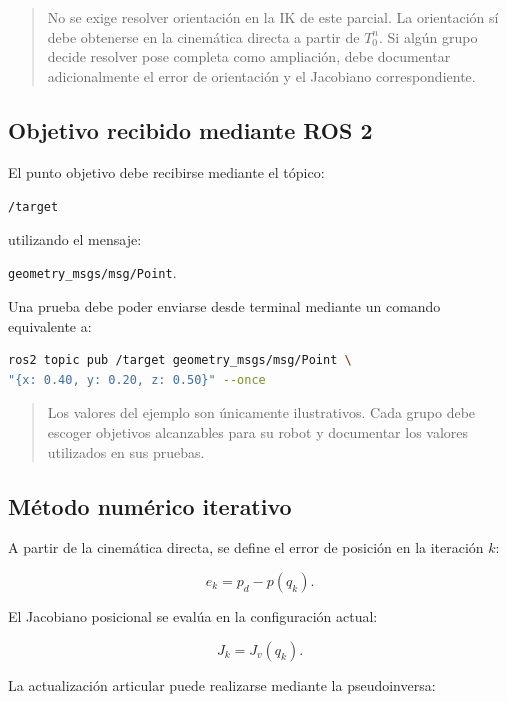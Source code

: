 \documentclass[journal]{IEEEtran}
\newcommand{\instr}[1]{%
\begin{quote}
\small
\noindent\textbf{\color{blue}{INSTRUCCIÓN:}} #1
\end{quote}
}
\begin{document}
\instr{No se exige resolver orientación en la IK de este parcial. La orientación sí debe obtenerse en la cinemática directa a partir de $T_0^n$. Si algún grupo decide resolver pose completa como ampliación, debe documentar adicionalmente el error de orientación y el Jacobiano correspondiente.}

\subsection{Objetivo recibido mediante ROS 2}

El punto objetivo debe recibirse mediante el tópico:

\begin{center}
\texttt{/target}
\end{center}

utilizando el mensaje:

\begin{center}
\texttt{geometry\_msgs/msg/Point}.
\end{center}

Una prueba debe poder enviarse desde terminal mediante un comando equivalente a:

\begin{lstlisting}[language=bash]
ros2 topic pub /target geometry_msgs/msg/Point \
"{x: 0.40, y: 0.20, z: 0.50}" --once
\end{lstlisting}

\instr{Los valores del ejemplo son únicamente ilustrativos. Cada grupo debe escoger objetivos alcanzables para su robot y documentar los valores utilizados en sus pruebas.}

\subsection{Método numérico iterativo}

A partir de la cinemática directa, se define el error de posición en la iteración $k$:

\begin{equation}
e_k =
p_d - p(q_k).
\end{equation}

El Jacobiano posicional se evalúa en la configuración actual:

\begin{equation}
J_k = J_v(q_k).
\end{equation}

La actualización articular puede realizarse mediante la pseudoinversa:
\end{document}
